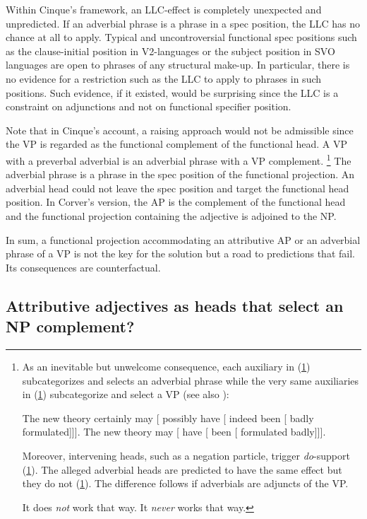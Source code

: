 \documentclass[output=paper
  ,nobabel
  ,uniformtopskip %
]{langscibook}
\begin{document}
Within Cinque's framework, an LLC-effect is completely unexpected and unpredicted. If an adverbial phrase is a phrase in a spec position, the LLC has no chance at all to apply. Typical and uncontroversial functional spec positions such as the clause-initial position in V2-languages or the subject position in SVO languages are open to phrases of any structural make-up. In particular, there is no evidence for a restriction such as the LLC to apply to phrases in such positions. Such evidence, if it existed, would be surprising since the LLC is a constraint on adjunctions and not on functional specifier position.

Note that in Cinque's account, a raising approach would not be admissible since the VP is regarded as the functional complement of the functional head. A VP with a preverbal adverbial is an adverbial phrase with a VP complement.%
%
\footnote{As an inevitable but unwelcome consequence, each auxiliary in (\ref{ex-theory})
  subcategorizes and selects an adverbial phrase while the very same auxiliaries in (\ref{ex-badly})
  subcategorize and select a VP (see also \citealt[Section~4.6.1.3]{MuellerGT-Eng1}):

\ea\label{ex-theory} 
The new theory certainly may [ possibly have [ indeed been [ badly formulated]]].
\z
\ea\label{ex-badly} 
The new theory may [ have [ been [ formulated badly]]].
\z

\noindent
Moreover, intervening heads, such as a negation particle, trigger \emph{do}-support (\ref{ex-doesnot}). The alleged adverbial heads are predicted to have the same effect but they do not (\ref{ex-never}). The difference follows if adverbials are adjuncts of the VP.

\ea
\label{ex-doesnot} 
It does \emph{not} work that way.
\z
\ea
\label{ex-never} 
It \emph{never} works that way.
\zlast
}
The adverbial phrase is a phrase in the spec position of the functional projection. An adverbial head could not leave the spec position and target the functional head position. In Corver's version, the AP is the complement of the functional head and the functional projection containing the adjective is adjoined to the NP.

In sum, a functional projection accommodating an attributive AP or an adverbial phrase of a VP is not the key for the solution but a road to predictions that fail. Its consequences are counterfactual.

\subsection{Attributive adjectives as heads that select an NP complement?}\label{subsec-adjectives}
\end{document}
